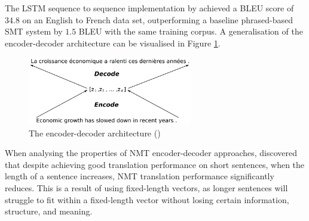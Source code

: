 The \acrshort{LSTM} sequence to sequence implementation by \cite{sutskever_sequence_2014} achieved a \acrshort{BLEU} score of $34.8$ on an English to French data set, outperforming a baseline phrased-based \acrshort{SMT} system by $1.5$ \acrshort{BLEU} with the same training corpus.
A generalisation of the encoder-decoder architecture can be visualised in Figure \ref{fig:encoder_decoder}.
\begin{figure}[ht!]
\centering
\includegraphics[width=0.64\textwidth]{media/literature/machine_translation/mt_encoder-decoder.png}
\caption[Diagram of the encoder-decoder architecture]{The encoder-decoder architecture (\cite{cho_properties_2014})}
\label{fig:encoder_decoder}
\end{figure}







When analysing the properties of \acrshort{NMT} encoder-decoder approaches, \cite{cho_properties_2014} discovered that despite achieving good translation performance on short sentences, when the length of a sentence increases, \acrshort{NMT} translation performance significantly reduces. This is a result of using fixed-length vectors, as longer sentences will struggle to fit within a fixed-length vector without losing certain information, structure, and meaning.

